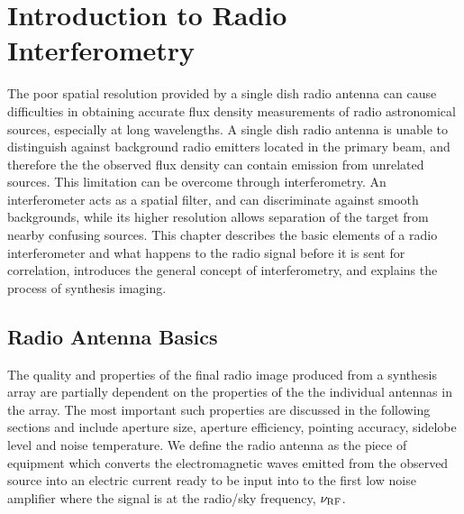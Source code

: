 

\chapter{Introduction to Radio Interferometry} 
\label{chap:2}

The poor spatial resolution provided by a single dish radio antenna can cause difficulties in obtaining accurate flux density measurements of radio astronomical sources, especially at long wavelengths. A single dish radio antenna is unable to distinguish against background radio emitters located in the primary beam, and therefore the the observed flux density can contain emission from unrelated sources. This limitation can be overcome through interferometry. An interferometer acts as a spatial filter, and can discriminate against smooth backgrounds, while its higher resolution allows separation of the target from nearby confusing sources. This chapter describes the basic elements of a radio interferometer and what happens to the radio signal before it is sent for correlation, introduces the general concept of interferometry, and  explains the process of synthesis imaging.

\section{Radio Antenna Basics}\label{sec:1}
The quality and properties of the final radio image produced from a synthesis array are partially dependent on the properties of the the individual antennas in the array. The most important such properties are discussed in the following sections and include aperture size, aperture efficiency, pointing accuracy, sidelobe level and noise temperature. We define the radio antenna as the piece of equipment which converts the electromagnetic waves emitted from the observed source into an electric current ready to be input into to the first low noise amplifier where the signal is at the radio/sky frequency, $\nu _{\rm{RF}}$.
